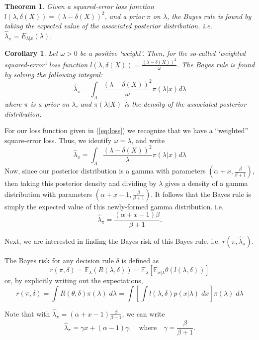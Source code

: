 \documentclass[11pt]{report}
\newtheorem{corollary}{Corollary}
\newtheorem{theorem}{Theorem}
\begin{document}
\begin{theorem}
Given a squared-error loss function $l(\lambda, \delta(X)) = (\lambda - \delta(X))^2$, and a prior $\pi$ on $\lambda$, the Bayes rule is found by taking the expected value of the associated posterior distribution. i.e. $\widehat{\lambda}_\pi = E_{\lambda|x}(\lambda)$. 
\end{theorem}

\begin{corollary}
Let $\omega >0$ be a positive `weight'. Then, for the so-called `weighted squared-error` loss function $l(\lambda, \delta(X)) = \frac{(\lambda - \delta(X))^2}{\omega}$. The Bayes rule is found by solving the following integral:
$$\widehat{\lambda}_\pi = \int_\Lambda\frac{(\lambda - \delta(X))^2}{\omega} \pi(\lambda|x) d\lambda$$
where $\pi$ is a prior on $\lambda$, and $\pi(\lambda|X)$ is the density of the associated posterior distribution. 
\end{corollary}			

For our loss function given in (\ref{eq:loss}) we recognize that we have a ``weighted'' square-error loss. Thus, we identify $\omega = \lambda$, and write  
$$\widehat{\lambda}_\pi = \int_\Lambda\frac{(\lambda - \delta(X))^2}{\lambda} \pi(\lambda|x) d\lambda$$
Now, since our posterior distribution is a gamma with parameters $\left(\alpha+x, \frac{\beta}{\beta+1}\right)$, then taking this posterior density and dividing by $\lambda$ gives a density of a gamma distribution with parameters $\left(\alpha+x-1, \frac{\beta}{\beta+1}\right)$. It follows that the Bayes rule is simply the expected value of this newly-formed gamma distribution. i.e.
$$\widehat{\lambda}_\pi = \frac{(\alpha +x-1)\beta}{\beta+1}.$$
		
Next, we are interested in finding the Bayes risk of this Bayes rule. i.e. $r(\pi, \widehat{\lambda}_\pi)$. 
		
The Bayes risk for any decision rule $\delta$ is defined as 
		$$r(\pi, \delta) = \mathbb{E}_\lambda(R(\lambda,\delta)) = \mathbb{E}_\lambda\left[\mathbb{E}_{x|\lambda}\theta\left(l(\lambda, \delta)\right) \right]$$
		or, by explicitly writing out the expectations,
		$$r(\pi, \delta) = \int R(\theta,\delta) \pi(\lambda)\; d\lambda = \int\left[ \int l(\lambda,\delta)p(x|\lambda) \;dx\right] \pi(\lambda)\; d\lambda$$
		

Note that with $\widehat{\lambda}_\pi = (\alpha +x-1)\frac{\beta}{\beta+1}$, we can write	
$$\widehat{\lambda}_\pi = \gamma x + (\alpha-1)\gamma,\quad \text{where} \quad \gamma = \frac{\beta}{\beta+1}.$$
\end{document}

